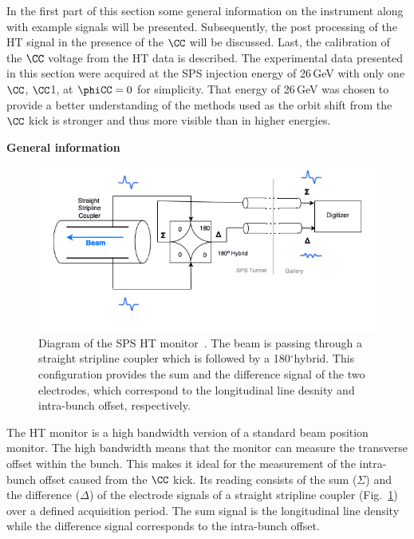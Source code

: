  In the first part of this section some general information on the instrument along with example signals will be presented. Subsequently, the post processing of the HT signal in the presence of the $\CC$ will be discussed. Last, the calibration of the $\CC$ voltage from the HT data is described. The experimental data presented in this section were acquired at the SPS injection energy of 26\,GeV with only one $\CC$, $\CC$1, at $\phiCC=0$ for simplicity. That energy of 26\,GeV was chosen to provide a better understanding of the methods used as the orbit shift from the $\CC$ kick is stronger and thus more visible than in higher energies.



\normalsize{\textbf{General information}}\\
\begin{figure}[h]%
   \centering         
   \includegraphics[width=1.0\textwidth]{images/Ch4/HT_monitor_sketch.png}
       \caption{Diagram of the SPS HT monitor~\cite{Levens:2313358}. The beam is passing through a straight stripline coupler which is followed by a 180$^\circ$hybrid. This configuration provides the sum and the difference signal of the two electrodes, which correspond to the longitudinal line desnity and intra-bunch offset, respectively.} 
       \label{fig:SPS_HT_diagram}
\end{figure}

The HT monitor is a high bandwidth version of a standard beam position monitor. The high bandwidth means that the monitor can measure the transverse offset within the bunch. This makes it ideal for the measurement of the intra-bunch offset caused from the $\CC$ kick. Its reading consists of the sum ($\Sigma$) and the  difference ($\Delta$) of the electrode signals of a straight stripline coupler (Fig.~\ref{fig:SPS_HT_diagram})~\cite{Jones:987561, Levens:2313358} over a defined acquisition period. The sum signal is the longitudinal line density while the difference signal corresponds to the intra-bunch offset. 

